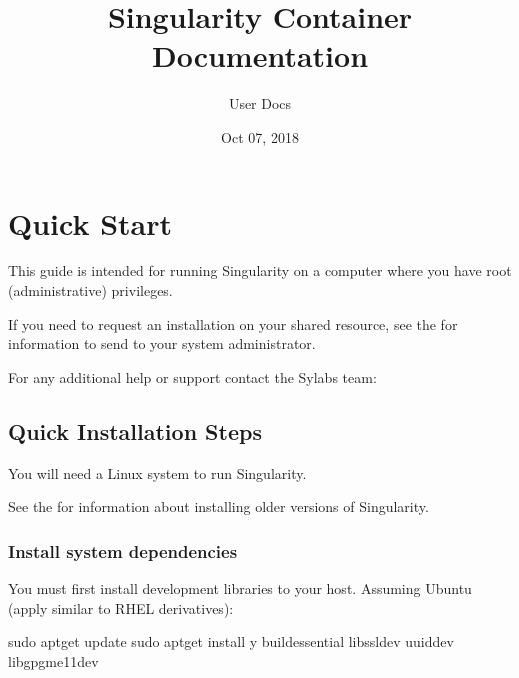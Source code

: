 \documentclass[letterpaper,10pt,english]{sphinxmanual}
\title{Singularity Container Documentation}
\date{Oct 07, 2018}
\author{User Docs}
\begin{document}
\maketitle
\sphinxtableofcontents
{}\label{\detokenize{index::doc}}



\chapter{Quick Start}
\label{\detokenize{quick_start:quick-start}}\label{\detokenize{quick_start:id1}}\label{\detokenize{quick_start::doc}}\label{\detokenize{quick_start:sec-quickstart}}
This guide is intended for running Singularity on a computer where you
have root (administrative) privileges.

If you need to request an installation on your shared resource, see the
 for
information to send to your system administrator.

For any additional help or support contact the Sylabs team:


\section{Quick Installation Steps}
\label{\detokenize{quick_start:quick-installation-steps}}\label{\detokenize{quick_start:quick-installation}}
You will need a Linux system to run Singularity.

See the  for information about installing
older versions of Singularity.


\subsection{Install system dependencies}
\label{\detokenize{quick_start:install-system-dependencies}}
You must first install development libraries to your host. Assuming Ubuntu
(apply similar to RHEL derivatives):

%
\begin{sphinxVerbatim}[commandchars=\\\{\}]
\PYGZdl{} sudo apt\PYGZhy{}get update \PYGZam{}\PYGZam{} sudo apt\PYGZhy{}get install \PYGZhy{}y \PYGZbs{}
    build\PYGZhy{}essential \PYGZbs{}
    libssl\PYGZhy{}dev \PYGZbs{}
    uuid\PYGZhy{}dev \PYGZbs{}
    libgpgme11\PYGZhy{}dev
\end{sphinxVerbatim}
\end{document}
